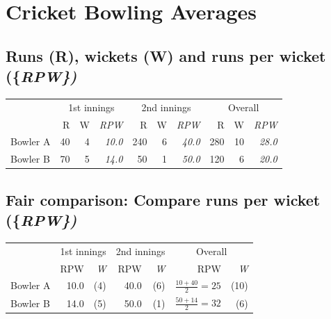 \documentclass[
  10pt,
  b5paper]{book}
\begin{document}
\hypertarget{cricket-bowling-averages}{%
\section{Cricket Bowling Averages}\label{cricket-bowling-averages}}

\hypertarget{runs-r-wickets-w-and-runs-per-wicket}{%
\subsection*{\texorpdfstring{Runs (R), wickets (W) and runs per wicket (\{\em RPW\})}{Runs (R), wickets (W) and runs per wicket (\{\})}}\label{runs-r-wickets-w-and-runs-per-wicket}}

\vspace*{-8pt}

\begin{center}
\begin{tabular}{lrrr||rrr||rrr}
\hline
 & \multicolumn{3}{c}{1st innings} & \multicolumn{3}{c}{2nd innings} &
\multicolumn{3}{c}{Overall} \\
\cline{2-4} \cline{5-7} \cline{8-10}
& R & W & {\em RPW}   & R & W & {\em RPW} & R & W
& {\em RPW}\\
Bowler A & 40 & 4 & {\em 10.0} & 240 & 6 & {\em 40.0} & 280 & 10 &
{\em 28.0}\\
Bowler B & 70 & 5 & {\em 14.0} & 50 & 1 & {\em 50.0} & 120 & 6 & {\em 20.0} \\
\hline
\end{tabular}
\end{center}

\hypertarget{fair-comparison-compare-runs-per-wicket}{%
\subsection*{\texorpdfstring{Fair comparison: Compare runs per wicket (\{\em RPW\})}{Fair comparison: Compare runs per wicket (\{\})}}\label{fair-comparison-compare-runs-per-wicket}}

\vspace*{-5pt}

\begin{center}
\begin{tabular}{lrr||rr||rr}
\hline
 & \multicolumn{2}{c}{1st innings} & \multicolumn{2}{c}{2nd innings} &
\multicolumn{2}{c}{Overall} \\
\cline{2-3} \cline{4-5} \cline{6-7}
         &  RPW & {\em W}   &  RPW & {\em W} &
           RPW & {\em W} \\[4pt]
Bowler A &  10.0 & (4) & 40.0 & (6)  &
$\frac{10+40}{2} = 25$ & (10)\\[4pt]
Bowler B & 14.0 & (5)  & 50.0 & (1) & $\frac{50+14}{2} = 32$  &  (6)\\[4pt]
\cline{2-3} \cline{4-5} \cline{6-7}
\end{tabular}
\end{center}
\end{document}
